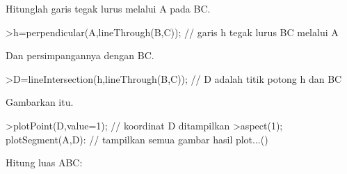\documentclass[a4paper,10pt]{article}
\begin{document}
\begin{eulernotebook}
\begin{eulercomment}
\begin{eulercomment}
\begin{eulercomment}
\begin{eulercomment}
\begin{eulercomment}
\begin{eulercomment}
\begin{eulercomment}
\begin{eulercomment}
\begin{eulercomment}
\begin{eulercomment}
\begin{eulercomment}
\begin{eulercomment}
\begin{eulercomment}
\begin{eulercomment}
\begin{eulercomment}
\begin{eulercomment}
\begin{eulercomment}
\begin{eulercomment}
\begin{eulercomment}
\begin{eulercomment}
\begin{eulercomment}
\begin{eulercomment}
\begin{eulercomment}
\begin{eulercomment}
\begin{eulercomment}
\begin{eulercomment}
\begin{eulercomment}
\begin{eulercomment}
\begin{eulercomment}
\begin{eulercomment}
\begin{eulerprompt}
\end{eulerprompt}
\begin{euleroutput}
  [-1,  2,  2]
\end{euleroutput}
\begin{eulercomment}
Hitunglah garis tegak lurus melalui A pada BC.
\end{eulercomment}
\begin{eulerprompt}
>h=perpendicular(A,lineThrough(B,C)); // garis h tegak lurus BC melalui A
\end{eulerprompt}
\begin{eulercomment}
Dan persimpangannya dengan BC.
\end{eulercomment}
\begin{eulerprompt}
>D=lineIntersection(h,lineThrough(B,C)); // D adalah titik potong h dan BC
\end{eulerprompt}
\begin{eulercomment}
Gambarkan itu.
\end{eulercomment}
\begin{eulerprompt}
>plotPoint(D,value=1); // koordinat D ditampilkan
>aspect(1); plotSegment(A,D): // tampilkan semua gambar hasil plot...()
\end{eulerprompt}
\begin{eulercomment}
Hitung luas ABC:


\end{eulercomment}
\end{eulercomment}
\end{eulercomment}
\end{eulercomment}
\end{eulercomment}
\end{eulercomment}
\end{eulercomment}
\end{eulercomment}
\end{eulercomment}
\end{eulercomment}
\end{eulercomment}
\end{eulercomment}
\end{eulercomment}
\end{eulercomment}
\end{eulercomment}
\end{eulercomment}
\end{eulercomment}
\end{eulercomment}
\end{eulercomment}
\end{eulercomment}
\end{eulercomment}
\end{eulercomment}
\end{eulercomment}
\end{eulercomment}
\end{eulercomment}
\end{eulercomment}
\end{eulercomment}
\end{eulercomment}
\end{eulercomment}
\end{eulercomment}
\end{eulercomment}
\end{eulernotebook}
\end{document}
